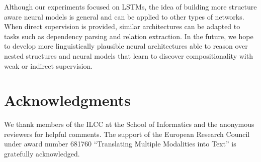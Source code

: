 \documentclass[11pt,letterpaper]{article}
\begin{document}
	Although our experiments focused on LSTMs, the idea of
        building more structure aware neural models is general and can
        be applied to other types of networks. When direct supervision
        is provided, similar architectures can be adapted to tasks
        such as dependency parsing and relation extraction. In the
        future, we hope to develop more linguistically plausible
        neural architectures able to reason over nested structures and
        neural models that learn to discover compositionality with
        weak or indirect supervision.
	
	\section*{Acknowledgments}
        We thank members of the ILCC at the School of Informatics and
        the anonymous reviewers for helpful comments. The support of
        the European Research Council under award number 681760
        ``Translating Multiple Modalities into Text'' is gratefully
        acknowledged.

	
	
	
\end{document}
